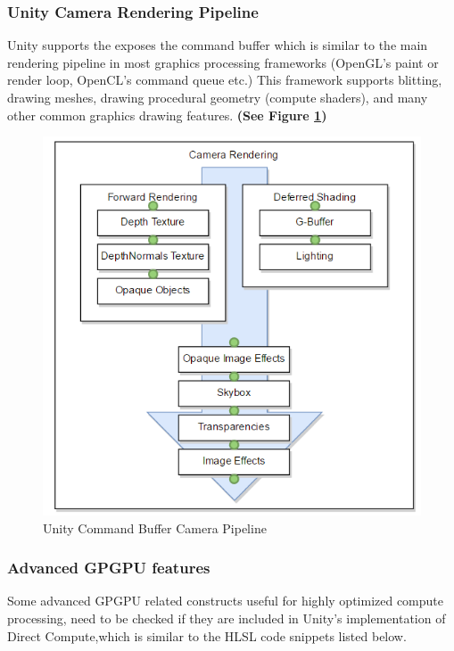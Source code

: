 \documentclass[a4paper,10pt]{article}
\begin{document}
\pagebreak


\subsubsection{Unity Camera Rendering Pipeline}
Unity supports the exposes the command buffer which is similar to the main rendering pipeline in most graphics processing frameworks (OpenGL's paint or render loop, OpenCL's command queue etc.) This framework supports blitting, drawing meshes, drawing procedural geometry (compute shaders), and many other common graphics drawing features. \textbf{(See Figure \ref{fig:gpuPipe})} %

\begin{figure}[H]
	\includegraphics[width=\linewidth,height=\paperheight,keepaspectratio]{cameraRender.png}
	\caption{Unity Command Buffer Camera Pipeline}
	\label{fig:gpuPipe}
	\end{figure}

\pagebreak

\subsubsection{Advanced GPGPU features}
Some advanced GPGPU related constructs useful for highly optimized compute 
processing, need to be checked if they are included in Unity's implementation of Direct Compute,which 
is similar to the HLSL code snippets listed below.
\end{document}
